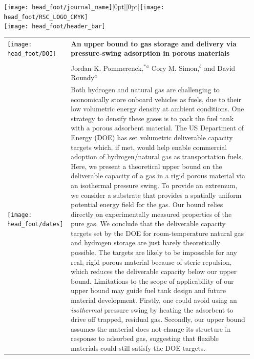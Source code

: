 \documentclass[twoside,twocolumn,9pt]{article}
\begin{document}
  \begin{@twocolumnfalse}
{\texttt{[image: head\_foot/journal\_name]}\hfill\raisebox{0pt}[0pt][0pt]{\texttt{[image: head\_foot/RSC\_LOGO\_CMYK]}}\\[1ex]
\texttt{[image: head\_foot/header\_bar]}}\par
\vspace{1em}
\sffamily
\begin{tabular}{m{4.5cm} p{13.5cm} }

\texttt{[image: head\_foot/DOI]} & \noindent\LARGE{\textbf{An upper bound to gas storage and delivery via pressure-swing adsorption in
porous materials}} \\%
\vspace{0.3cm} & \vspace{0.3cm} \\

 & \noindent\large{Jordan K. Pommerenck,$^{\ast}$\textit{$^{a}$} Cory M. Simon,\textit{$^{b}$} and David Roundy\textit{$^{a}$}} \\%

\texttt{[image: head\_foot/dates]} & \noindent\normalsize{
Both hydrogen
and natural gas are challenging to economically store onboard vehicles as
fuels, due to their low volumetric energy density at ambient conditions.
One strategy to densify
these gases is to pack the fuel tank with a porous
adsorbent material.
% 
The US Department of
Energy (DOE) has set volumetric deliverable capacity
targets which, if met, would help
enable commercial adoption of hydrogen/natural gas as transportation fuels.
%
%
Here, we present a
theoretical upper bound on the deliverable capacity of a gas in a rigid
porous
material via an isothermal pressure swing.
%
To provide an extremum, we consider
a substrate that provides a spatially uniform potential energy field for the
gas. Our bound relies directly on experimentally measured
properties of the pure gas.
%
We conclude
that the deliverable capacity targets set by the DOE for room-temperature natural gas and hydrogen
storage are just barely theoretically possible.
The targets are likely to be impossible for any real,
rigid porous material because of steric
repulsion, which reduces the deliverable capacity below our upper
bound. Limitations
to the scope of applicability of our upper bound may guide fuel tank design and
future material development. Firstly, one could avoid using an \emph{isothermal}
pressure swing by heating the adsorbent to drive off
trapped, residual gas. Secondly,
our upper bound assumes the material does not change its
structure in response to adsorbed gas, suggesting that flexible materials could
still satisfy the DOE targets.}


\end{tabular}
\end{@twocolumnfalse}
\end{document}
